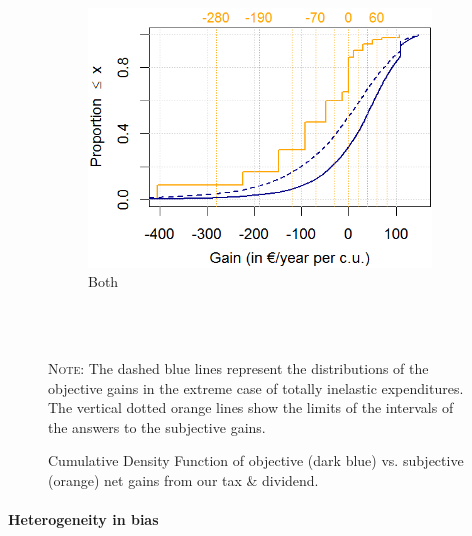 \documentclass[12pt]{article} %
\begin{document}
\begin{figure}[H]
{\begin{subfigure}{.3\paperwidth}
\includegraphics[width=0.28\paperwidth]{Images/cdf_carbon_tax_titled.png}
\caption{Both}
\end{subfigure}
}
\\ \quad \\  \parbox[t]{\textwidth}{\linespread{1.2}\selectfont \footnotesize{\textsc{Note:} The dashed blue lines represent the distributions of the objective gains in the extreme case of totally inelastic expenditures. The vertical dotted orange lines show the limits of the intervals of the answers to the subjective gains.}
\caption{Cumulative Density Function of objective (dark blue) vs. subjective (orange) net gains from our tax \& dividend. \label{fig:step_cdf}}}
\end{figure} %

\paragraph{Heterogeneity in bias}

\end{document}
